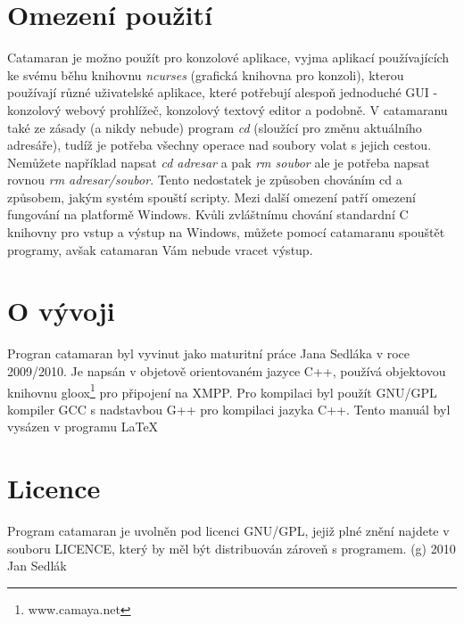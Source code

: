 \documentclass[a4paper,11pt,titlepage]{article}
\begin{document}
\section{Omezení použití}
Catamaran je možno použít pro konzolové aplikace, vyjma aplikací pou\-ží\-vají\-cích ke svému běhu knihovnu \emph{ncurses} (grafická knihovna pro konzoli), kterou používají různé uživatelské 
aplikace, které potřebují alespoň jednoduché GUI - konzolový webový prohlížeč, konzolový textový editor a podobně. V catamaranu také ze zásady  (a nikdy  nebude) 
program \emph{cd} (sloužící pro změnu aktuálního adresáře), tudíž je potřeba všechny operace nad soubory volat s jejich cestou. Nemůžete například napsat \emph{cd adresar} a pak 
\emph{rm soubor} ale je potřeba napsat rovnou \emph{rm adresar/soubor}. Tento nedostatek je způsoben chováním cd a způsobem, jakým sys\-tém spou\-ští scripty. Mezi další omezení patří
omezení fungování na platformě Windows. Kvůli zvláštnímu chování standardní C knihovny pro vstup a výstup na Windows, můžete pomocí catamaranu spouštět programy, avšak catamaran Vám nebude
vracet výstup.
\section{O vývoji}
Progran catamaran byl vyvinut jako maturitní práce Jana Sedláka v roce 2009/2010. Je napsán v objetově orientovaném jazyce C++, používá objektovou knihovnu gloox\footnote{www.camaya.net}
pro připojení na XMPP. Pro kompilaci byl použít GNU/GPL kompiler GCC s nadstavbou G++ pro kompilaci jazyka C++. Tento manuál byl vysázen v programu \LaTeX
\section{Licence}
Program catamaran je uvolněn pod licenci GNU/GPL, jejiž plné znění najdete v souboru LICENCE, který by měl být distribuován zároveň s programem.
(g) 2010 Jan Sedlák
\end{document}
